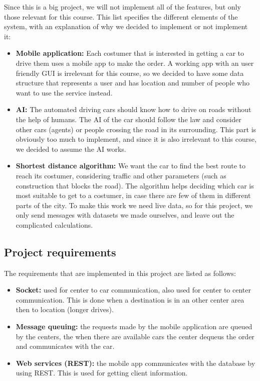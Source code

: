 \documentclass[a4paper]{article}
\begin{document}
Since this is a big project, we will not implement all of the features, but only those relevant for this course. This list specifies the different elements of the system, with an explanation of why we decided to implement or not implement it:
\begin{itemize}
    \item \textbf{Mobile application:} Each costumer that is interested in getting a car to drive them uses a mobile app to make the order. A working app with an user friendly GUI is irrelevant for this course, so we decided to have some data structure that represents a user and has location and number of people who want to use the service instead.
    \item \textbf{AI:} The automated driving cars should know how to drive on roads without the help of humans. The AI of the car should follow the law and consider other cars (agents) or people crossing the road in its surrounding. This part is obviously too much to implement, and since it is also irrelevant to this course, we decided to assume the AI works.
    \item \textbf{Shortest distance algorithm:} We want the car to find the best route to reach its costumer, considering traffic and other parameters (such as construction that blocks the road). The algorithm helps deciding which car is most suitable to get to a costumer, in case there are few of them in different parts of the city. To make this work we need live data, so for this project, we only send messages with datasets we made ourselves, and leave out the complicated calculations.
\end{itemize}

\subsection*{Project requirements}
The requirements that are implemented in this project are listed as follows:
\begin{itemize}
    \item \textbf{Socket:} used for center to car communication, also used for center to center communication. This is done when a destination is in an other center area then to location (longer drives).
    \item \textbf{Message queuing:} the requests made by the mobile application are queued by the centers, the when there are available cars the center dequeus the order and communicates with the car. 
    \item \textbf{Web services (REST):} the mobile app communicates with the database by using REST. This is used for getting client information.
\end{itemize}
\end{document}
